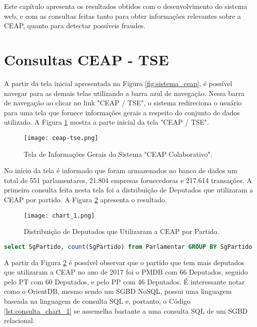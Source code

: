 Este capítulo apresenta os resultados obtidos com o desenvolvimento do sistema web, e com as consultas feitas tanto para obter informações relevantes sobre a CEAP, quanto para detectar possíveis fraudes.

\section{Consultas CEAP - TSE} \label{consulta_ceap_tse}

A partir da tela inicial apresentada na Figura \ref{fig:sistema_ceap}, é possível navegar para as demais telas utilizando a barra azul de navegação. Nessa barra de navegação ao clicar no link "CEAP / TSE", o sistema redireciona o usuário para uma tela que fornece informações gerais a respeito do conjunto de dados utilizado. A Figura \ref{fig:sistema_ceap_tse} mostra a parte inicial da tela "CEAP / TSE".

\begin{figure}[H]
\centering
\texttt{[image: ceap-tse.png]}
\caption{Tela de Informações Gerais do Sistema "CEAP Colaborativo".}
\label{fig:sistema_ceap_tse}
\end{figure}

No início da tela é informado que foram armazenados no banco de dados um total de 551 parlamentares, 21.804 empresas fornecedoras e 217.614 transações.
A primeira consulta feita nesta tela foi a distribuição de Deputados que utilizaram a CEAP por partido. A Figura \ref{fig:chart_1} apresenta o resultado.

\begin{figure}[H]
\centering
\texttt{[image: chart\_1.png]}
\caption{Distribuição de Deputados que Utilizaram a CEAP por Partido.}
\label{fig:chart_1}
\end{figure}

\begin{lstlisting}[label={lst:consulta_chart_1}, caption={Consulta para a Figura \ref{fig:chart_1}},captionpos=b, language=sql]
select SgPartido, count(SgPartido) from Parlamentar GROUP BY SgPartido
\end{lstlisting}

A partir da Figura \ref{fig:chart_1} é possível observar que o partido que tem mais deputados que utilizaram a CEAP no ano de 2017 foi o PMDB com 66 Deputados, seguido pelo PT com 60 Deputados, e pelo PP com 46 Deputados. É interessante notar como o OrientDB, mesmo sendo um SGBD NoSQL, possui uma linguagem baseada na linguagem de consulta SQL e, portanto, o Código \ref{lst:consulta_chart_1} se assemelha bastante a uma consulta SQL de um SGBD relacional.

